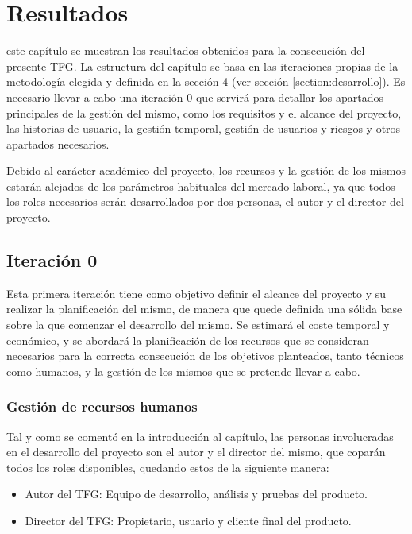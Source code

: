 \chapter{Resultados}
\label{chap:resultados}



 este capítulo se muestran los resultados obtenidos para la consecución del presente \ac{TFG}. La estructura del capítulo se basa en las iteraciones propias de la metodología elegida y definida en la sección 4 (ver sección \ref{section:desarrollo}). Es necesario llevar a cabo una iteración 0 que servirá para detallar los apartados principales de la gestión del mismo, como los requisitos y el alcance del proyecto, las historias de usuario, la gestión temporal, gestión de usuarios y riesgos y otros apartados necesarios.

Debido al carácter académico del proyecto, los recursos y la gestión de los mismos estarán alejados de los parámetros habituales del mercado laboral, ya que todos los roles necesarios serán desarrollados por dos personas, el autor y el director del proyecto.

\section{Iteración 0}
Esta primera iteración tiene como objetivo definir el alcance del proyecto y su realizar la planificación del mismo, de manera que quede definida una sólida base sobre la que comenzar el desarrollo del mismo. Se estimará el coste temporal y económico, y se abordará la planificación de los recursos que se consideran necesarios para la correcta consecución de los objetivos planteados, tanto técnicos como humanos, y la gestión de los mismos que se pretende llevar a cabo.

	\subsection{Gestión de recursos humanos}
	Tal y como se comentó en la introducción al capítulo, las personas involucradas en el desarrollo del proyecto son el autor y el director del mismo, que coparán todos los roles disponibles, quedando estos de la siguiente manera:
	
	\begin{itemize}[label={$\bullet$},labelindent=\parindent,leftmargin=2cm]
		\item Autor del \ac{TFG}: Equipo de desarrollo, análisis y pruebas del producto.
		\item Director del \ac{TFG}: Propietario, usuario y cliente final del producto.
	\end{itemize}
	
